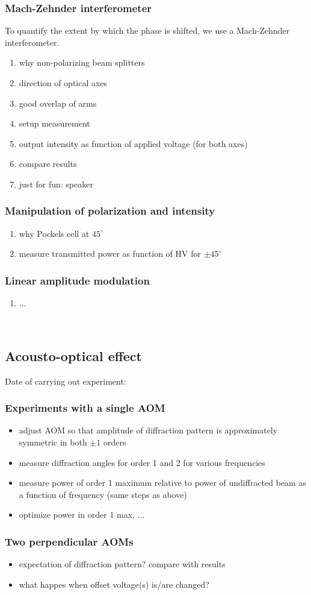 \subsubsection{Mach-Zehnder interferometer}
To quantify the extent by which the phase is shifted, we use a
Mach-Zehnder interferometer.
\begin{enumerate}
    \item why non-polarizing beam splitters
    \item direction of optical axes
    \item good overlap of arms
    \item setup measurement
    \item output intensity as function of applied voltage (for both axes)
    \item compare results
    \item just for fun: speaker
\end{enumerate}

\subsubsection{Manipulation of polarization and intensity}
\begin{enumerate}
    \item why Pockels cell at $45^\circ$
    \item measure transmitted power as function of HV for $\pm45^\circ$
\end{enumerate}

\subsubsection{Linear amplitude modulation}
\begin{enumerate}
    \item ...
\end{enumerate}


\newpage\ \newpage
\subsection{Acousto-optical effect}
Date of carrying out experiment: 

\subsubsection{Experiments with a single AOM}
\begin{itemize}
    \item adjust AOM so that amplitude of diffraction pattern is
    approximately symmetric in both $\pm 1$ orders
    \item measure diffraction angles for order 1 and 2 for
    various frequencies
    \item measure power of order 1 maximum relative to power of undiffracted
    beam as a function of frequency (same steps as above)
    \item optimize power in order 1 max, ...
\end{itemize}

\subsubsection{Two perpendicular AOMs}
\begin{itemize}
    \item expectation of diffraction pattern? compare with results
    \item what happes when offset voltage(s) is/are changed?
\end{itemize}
